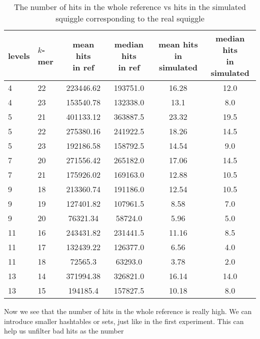 \begin{table}
\caption[TODO]{The number of hits in the whole reference vs hits in the simulated
squiggle corresponding to the real squiggle}
\label{tab:hitsRefvsSimul}
\begin{center}
\begin{tabular}{|l|l|c|c|c|c|}
\hline
levels & $k$-mer & \specialcell{mean hits\\in ref} & \specialcell{median hits\\in ref} & \specialcell{mean hits\\in simulated} & \specialcell{median hits\\in simulated} \\
\hline
4 & 22 & 223446.62 & 193751.0 & 16.28 & 12.0 \\
\hline
4 & 23 & 153540.78 & 132338.0 & 13.1 & 8.0 \\
\hline
5 & 21 & 401133.12 & 363887.5 & 23.32 & 19.5 \\
\hline
5 & 22 & 275380.16 & 241922.5 & 18.26 & 14.5 \\
\hline
5 & 23 & 192186.58 & 158792.5 & 14.54 & 9.0 \\
\hline
7 & 20 & 271556.42 & 265182.0 & 17.06 & 14.5 \\
\hline
7 & 21 & 175926.02 & 169163.0 & 12.88 & 10.5 \\
\hline
9 & 18 & 213360.74 & 191186.0 & 12.54 & 10.5 \\
\hline
9 & 19 & 127401.82 & 107961.5 & 8.58 & 7.0 \\
\hline
9 & 20 & 76321.34 & 58724.0 & 5.96 & 5.0 \\
\hline
11 & 16 & 243431.82 & 231441.5 & 11.16 & 8.5 \\
\hline
11 & 17 & 132439.22 & 126377.0 & 6.56 & 4.0 \\
\hline
11 & 18 & 72565.3 & 63293.0 & 3.78 & 2.0 \\
\hline
13 & 14 & 371994.38 & 326821.0 & 16.14 & 14.0 \\
\hline
13 & 15 & 194185.4 & 157827.5 & 10.18 & 8.0 \\
\hline
\end{tabular}
\end{center}
\end{table}

Now we see that the number of hits in the whole reference is really high. We can introduce smaller hashtables
or sets, just like in the first experiment. This can help us unfilter bad hits as the number
